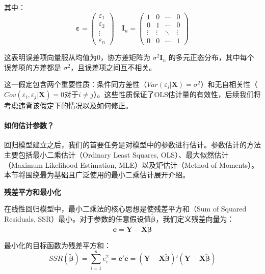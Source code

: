其中：
\begin{equation*}
	\boldsymbol{\varepsilon} = 
	\begin{pmatrix}
	\varepsilon_1 \\
	\varepsilon_2 \\
	\vdots \\
	\varepsilon_n
	\end{pmatrix} \quad 
	\mathbf{I}_n = 
	\begin{pmatrix}
	1 & 0 & \cdots & 0 \\
	0 & 1 & \cdots & 0 \\
	\vdots & \vdots & \ddots & \vdots \\
	0 & 0 & \cdots & 1
	\end{pmatrix}
\end{equation*}

这表明误差项向量服从均值为0，协方差矩阵为 $\sigma^2 \mathbf{I}_n$ 的多元正态分布，其中每个误差项的方差都是 $\sigma^2$，且误差项之间互不相关。

这一假定包含两个重要性质：条件同方差性（$Var(\varepsilon_i | \mathbf{X}) = \sigma^2$）和无自相关性（$Cov(\varepsilon_i, \varepsilon_j | \mathbf{X}) = 0$对于$i \neq j$）。这些性质保证了OLS估计量的有效性，后续我们将考虑违背该假定下的情况以及如何修正。

\paragraph*{如何估计参数？}

回归模型建立之后，我们的首要任务是对模型中的参数进行估计。参数估计的方法主要包括最小二乘估计（Ordinary Least Squares, OLS）、最大似然估计（Maximum Likelihood Estimation, MLE）以及矩估计（Method of Moments）。本节将围绕最为基础且广泛使用的最小二乘估计展开介绍。

\textbf{残差平方和最小化}

在线性回归模型中，最小二乘法的核心思想是使残差平方和（Sum of Squared Residuals, SSR）最小。对于参数的任意假设值$\tilde{\boldsymbol{\beta}}$，我们定义残差向量为：
\begin{equation}
\mathbf{e} = \mathbf{Y} - \mathbf{X}\tilde{\boldsymbol{\beta}}
\end{equation}

最小化的目标函数为残差平方和：
\begin{equation}
	SSR(\tilde{\boldsymbol{\beta}}) = \sum_{i=1}^n e_i^2 = \mathbf{e}'\mathbf{e} = (\mathbf{Y} - \mathbf{X}\tilde{\boldsymbol{\beta}})'(\mathbf{Y} - \mathbf{X}\tilde{\boldsymbol{\beta}})
\end{equation}

